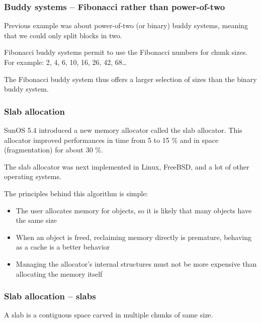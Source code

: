 
\begin{frame}
  \frametitle{Buddy systems -- Fibonacci rather than power-of-two}

  Previous example was about power-of-two (or binary) buddy systems,
  meaning that we could only split blocks in two.

  \-

  Fibonacci buddy systems permit to use the Fibonacci numbers for
  chunk sizes. For example: 2, 4, 6, 10, 16, 26, 42, 68\ldots

  \-

  The Fibonacci buddy system thus offers a larger selection of sizes
  than the binary buddy system.

\end{frame}


\begin{frame}
  \frametitle{Slab allocation}

  SunOS 5.4 introduced a new memory allocator called the slab
  allocator. This allocator improved performances in time from 5 to 15
  \% and in space (fragmentation) for about 30 \%.

  \-

  The slab allocator was next implemented in Linux, FreeBSD, and a lot
  of other operating systems.

  \-

  The principles behind this algorithm is simple:

  \begin{itemize}
  \item
    The user allocates memory for objects, so it is likely that many
    objects have the same size
  \item
    When an object is freed, reclaiming memory directly is premature,
    behaving as a cache is a better behavior
  \item
    Managing the allocator's internal structures must not be more
    expensive than allocating the memory itself
  \end{itemize}

\end{frame}


\begin{frame}
  \frametitle{Slab allocation -- slabs}

  A slab is a contiguous space carved in multiple chunks of same size.

  \begin{center}
  \end{center}

\end{frame}

